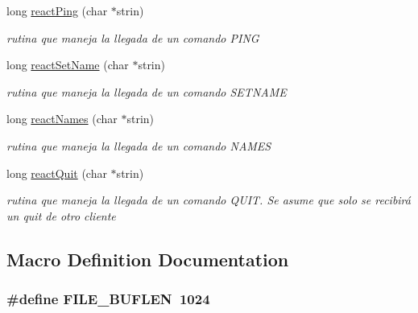 \begin{DoxyCompactItemize}
long \hyperlink{_g-2301-05-_p2-basic_commands_from_server_8h_a1d15466f16cbf9847a16ac4bf24b34fb}{react\-Ping} (char $\ast$strin)
\begin{DoxyCompactList}\small\item\em rutina que maneja la llegada de un comando P\-I\-N\-G \end{DoxyCompactList}\item 
long \hyperlink{_g-2301-05-_p2-basic_commands_from_server_8h_a7df438a44035b38ab4eacf045bbc131c}{react\-Set\-Name} (char $\ast$strin)
\begin{DoxyCompactList}\small\item\em rutina que maneja la llegada de un comando S\-E\-T\-N\-A\-M\-E \end{DoxyCompactList}\item 
long \hyperlink{_g-2301-05-_p2-basic_commands_from_server_8h_a62ca3a2f7e205eecb85ae220ac5c3c7b}{react\-Names} (char $\ast$strin)
\begin{DoxyCompactList}\small\item\em rutina que maneja la llegada de un comando N\-A\-M\-E\-S \end{DoxyCompactList}\item 
long \hyperlink{_g-2301-05-_p2-basic_commands_from_server_8h_a9261ac4f3ef8326c2954ac381b176016}{react\-Quit} (char $\ast$strin)
\begin{DoxyCompactList}\small\item\em rutina que maneja la llegada de un comando Q\-U\-I\-T. Se asume que solo se recibirá un quit de otro cliente \end{DoxyCompactList}\end{DoxyCompactItemize}


\subsection{Macro Definition Documentation}
\hypertarget{_g-2301-05-_p2-basic_commands_from_server_8h_ab4280385e15a48712d64d651acb2648d}{
\subsubsection[{F\-I\-L\-E\-\_\-\-B\-U\-F\-L\-E\-N}]{\setlength{\rightskip}{0pt plus 5cm}\#define F\-I\-L\-E\-\_\-\-B\-U\-F\-L\-E\-N~1024}}\label{_g-2301-05-_p2-basic_commands_from_server_8h_ab4280385e15a48712d64d651acb2648d}


